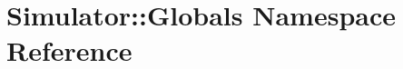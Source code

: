 \hypertarget{namespace_simulator_1_1_globals}{}\section{Simulator\+:\+:Globals Namespace Reference}
\label{namespace_simulator_1_1_globals}
